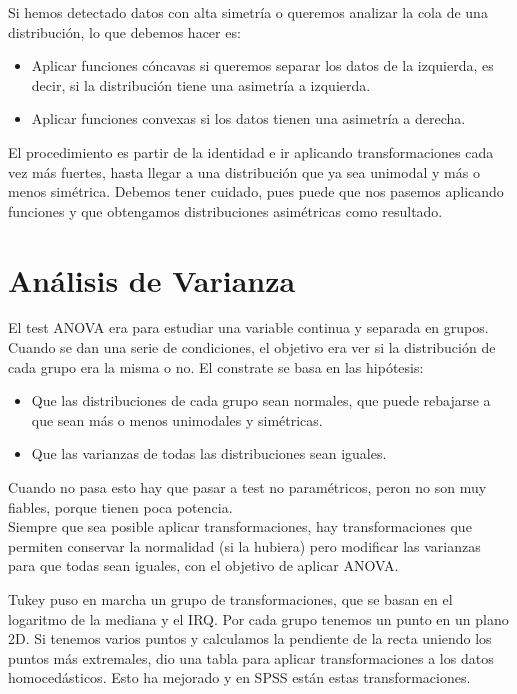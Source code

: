 \noindent
Si hemos detectado datos con alta simetría o queremos analizar la cola de una distribución, lo que debemos hacer es:
\begin{itemize}
    \item Aplicar funciones cóncavas si queremos separar los datos de la izquierda, es decir, si la distribución tiene una asimetría a izquierda.
    \item Aplicar funciones convexas si los datos tienen una asimetría a derecha.
\end{itemize}

El procedimiento es partir de la identidad e ir aplicando transformaciones cada vez más fuertes, hasta llegar a una distribución que ya sea unimodal y más o menos simétrica. Debemos tener cuidado, pues puede que nos pasemos aplicando funciones y que obtengamos distribuciones asimétricas como resultado.


\section{Análisis de Varianza}
\noindent
El test ANOVA era para estudiar una variable continua y separada en grupos. Cuando se dan una serie de condiciones, el objetivo era ver si la distribución de cada grupo era la misma o no. El constrate se basa en las hipótesis:
\begin{itemize}
    \item Que las distribuciones de cada grupo sean normales, que puede rebajarse a que sean más o menos unimodales y simétricas.
    \item Que las varianzas de todas las distribuciones sean iguales.
\end{itemize}
Cuando no pasa esto hay que pasar a test no paramétricos, peron no son muy fiables, porque tienen poca potencia.\\

\noindent
Siempre que sea posible aplicar transformaciones, hay transformaciones que permiten conservar la normalidad (si la hubiera) pero modificar las varianzas para que todas sean iguales, con el objetivo de aplicar ANOVA. 

\noindent
Tukey puso en marcha un grupo de transformaciones, que se basan en el logaritmo de la mediana y el IRQ. Por cada grupo tenemos un punto en un plano 2D. Si tenemos varios puntos y calculamos la pendiente de la recta uniendo los puntos más extremales, dio una tabla para aplicar transformaciones a los datos homocedásticos. Esto ha mejorado y en SPSS están estas transformaciones.\\

